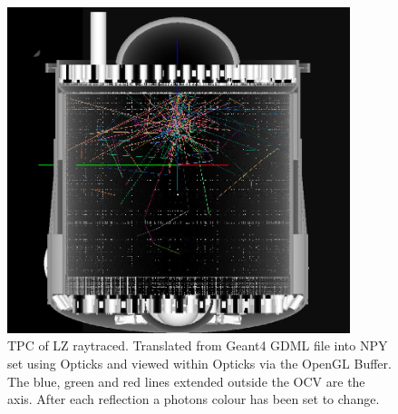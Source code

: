 \begin{figure}[!htbp]
\includegraphics[width=10cm]{Figures/Simulations/LZ_S1_photons_In_Opticks.png}
\centering
\caption{TPC of LZ raytraced. Translated from Geant4 GDML file into NPY set using Opticks and viewed within Opticks via the OpenGL Buffer.
The blue, green and red lines extended outside the OCV are the axis. After each reflection a photons colour has been set to change.}
\label{fig:OpticksLZTPC_S1_Photons}
\end{figure}